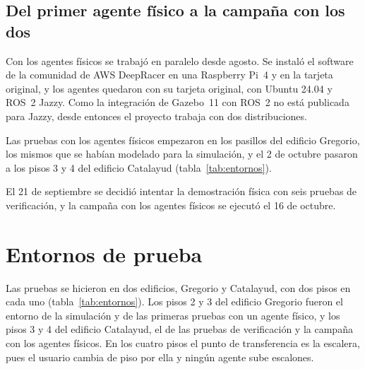 \subsection{Del primer agente físico a la campaña con los dos}
\label{sec:recorrido-fisico}

Con los agentes físicos se trabajó en paralelo desde agosto. Se instaló el software de la comunidad de AWS DeepRacer
\autocite{deepracercustomcar} en una Raspberry Pi~4 y en la tarjeta original, y los agentes quedaron con su tarjeta original, con
Ubuntu 24.04 y ROS~2 Jazzy. Como la integración de Gazebo~11 con ROS~2 no está publicada para Jazzy, desde entonces el proyecto
trabaja con dos distribuciones.

Las pruebas con los agentes físicos empezaron en los pasillos del edificio Gregorio, los mismos que se habían modelado para la
simulación, y el 2 de octubre pasaron a los pisos 3 y 4 del edificio Catalayud (tabla~\ref{tab:entornos}).

El 21 de septiembre se decidió intentar la demostración física con seis pruebas de verificación, y la campaña con los agentes físicos se ejecutó el 16 de octubre.

\section{Entornos de prueba}
\label{sec:entornos}

Las pruebas se hicieron en dos edificios, Gregorio y Catalayud, con dos pisos en cada uno (tabla~\ref{tab:entornos}). Los pisos 2 y 3
del edificio Gregorio fueron el entorno de la simulación y de las primeras pruebas con un agente físico, y los pisos 3 y 4 del edificio
Catalayud, el de las pruebas de verificación y la campaña con los agentes físicos. En los cuatro pisos el punto de transferencia es la
escalera, pues el usuario cambia de piso por ella y ningún agente sube escalones.

